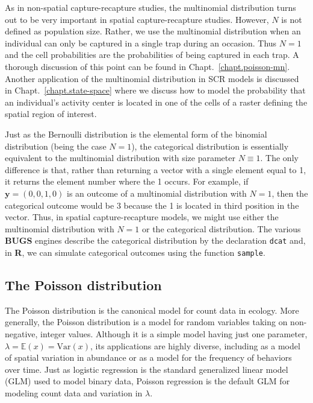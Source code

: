 As in non-spatial capture-recapture studies, the multinomial
distribution turns out to be very important in spatial
capture-recapture studies. However, $N$ is not defined as population
size. Rather, we use the multinomial distribution when an individual
can only be captured in a single trap during an occasion. Thus
$N=1$ and the cell probabilities are the probabilities of
being captured in each trap. A thorough discussion of this point can
be found in Chapt.~\ref{chapt.poisson-mn}. Another application of the
multinomial distribution in SCR models is discussed in
Chapt.~\ref{chapt.state-space} where we discuss how to model the
probability that an individual's activity center is located in one of
the cells of a raster defining the spatial region of interest.

Just as the Bernoulli distribution is the elemental form of the
 binomial distribution (being the case $N=1$), the
categorical distribution is essentially equivalent to
the multinomial distribution with size parameter
$N\equiv1$. The only difference is that, rather than returning a
vector with a single element equal to 1, it returns the element number
where the 1 occurs. For example, if $\mathbf{y}=(0,0,1,0)$ is an outcome of a
multinomial distribution with $N=1$, then the categorical outcome
would be 3 because the 1 is located in third position in the vector. Thus, in spatial
capture-recapture models, we might use either the multinomial
distribution with $N=1$ or %
the categorical distribution. %
The various {\bf BUGS} engines describe the categorical distribution
by the declaration \mbox{\tt dcat} and, in {\bf R}, we can simulate
categorical outcomes using the function \mbox{\tt sample}.


\subsection{The Poisson distribution}


The Poisson distribution is the canonical model for count data in
ecology.  More generally, the
Poisson distribution is a model for random variables taking on
non-negative, integer values.  Although it is a simple model having just one
parameter, $\lambda = \mathbb{E}(x) = \text{Var}(x)$, its applications
are highly diverse, including
as a model of spatial variation in abundance or as a model for the
frequency of behaviors over time.  Just as logistic regression is the
standard generalized linear model (GLM) used to model binary data, Poisson
regression is the default GLM for modeling count data and variation in
$\lambda$.

